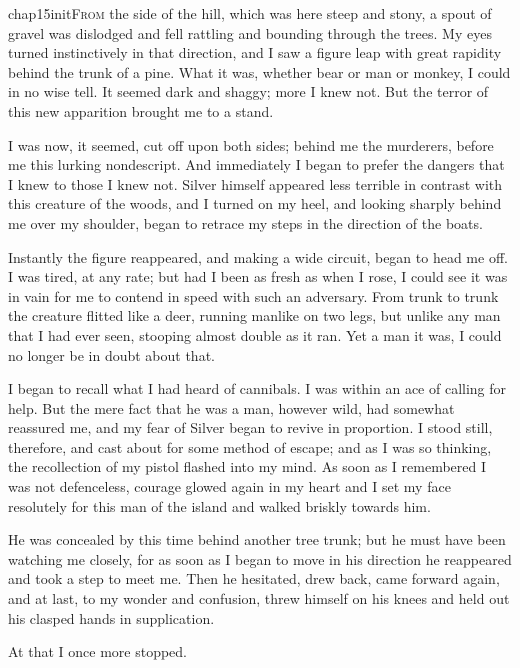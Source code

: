 
   \lettrine[lines=4,image=true]{chap15initF}{rom} the side of the hill, which was here steep and stony, a spout of gravel was dislodged and fell rattling and bounding through the trees. My eyes turned instinctively in that direction, and I saw a figure leap with great rapidity behind the trunk of a pine. What it was, whether bear or man or monkey, I could in no wise tell. It seemed dark and shaggy; more I knew not. But the terror of this new apparition brought me to a stand.

I was now, it seemed, cut off upon both sides; behind me the murderers, before me this lurking nondescript. And immediately I began to prefer the dangers that I knew to those I knew not. Silver himself appeared less terrible in contrast with this creature of the woods, and I turned on my heel, and looking sharply behind me over my shoulder, began to retrace my steps in the direction of the boats.

Instantly the figure reappeared, and making a wide circuit, began to head me off. I was tired, at any rate; but had I been as fresh as when I rose, I could see it was in vain for me to contend in speed with such an adversary. From trunk to trunk the creature flitted like a deer, running manlike on two legs, but unlike any man that I had ever seen, stooping almost double as it ran. Yet a man it was, I could no longer be in doubt about that.

I began to recall what I had heard of cannibals. I was within an ace of calling for help. But the mere fact that he was a man, however wild, had somewhat reassured me, and my fear of Silver began to revive in proportion. I stood still, therefore, and cast about for some method of escape; and as I was so thinking, the recollection of my pistol flashed into my mind. As soon as I remembered I was not defenceless, courage glowed again in my heart and I set my face resolutely for this man of the island and walked briskly towards him.

He was concealed by this time behind another tree trunk; but he must have been watching me closely, for as soon as I began to move in his direction he reappeared and took a step to meet me. Then he hesitated, drew back, came forward again, and at last, to my wonder and confusion, threw himself on his knees and held out his clasped hands in supplication.

At that I once more stopped.

